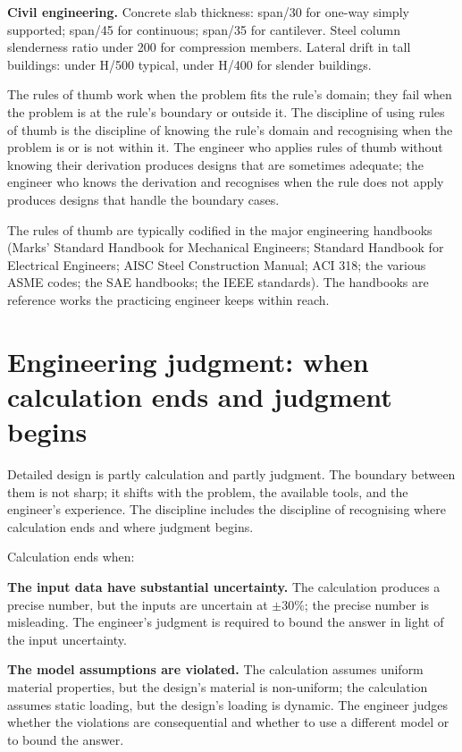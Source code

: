 \textbf{Civil engineering.} Concrete slab thickness: span/30 for one-way simply supported; span/45 for continuous; span/35 for cantilever. Steel column slenderness ratio under 200 for compression members. Lateral drift in tall buildings: under H/500 typical, under H/400 for slender buildings.

The rules of thumb work when the problem fits the rule's domain; they fail when the problem is at the rule's boundary or outside it. The discipline of using rules of thumb is the discipline of knowing the rule's domain and recognising when the problem is or is not within it. The engineer who applies rules of thumb without knowing their derivation produces designs that are sometimes adequate; the engineer who knows the derivation and recognises when the rule does not apply produces designs that handle the boundary cases.

The rules of thumb are typically codified in the major engineering handbooks (Marks' Standard Handbook for Mechanical Engineers; Standard Handbook for Electrical Engineers; AISC Steel Construction Manual; ACI 318; the various ASME codes; the SAE handbooks; the IEEE standards). The handbooks are reference works the practicing engineer keeps within reach.

\section{Engineering judgment: when calculation ends and judgment begins}

Detailed design is partly calculation and partly judgment. The boundary between them is not sharp; it shifts with the problem, the available tools, and the engineer's experience. The discipline includes the discipline of recognising where calculation ends and where judgment begins.

Calculation ends when:

\textbf{The input data have substantial uncertainty.} The calculation produces a precise number, but the inputs are uncertain at $\pm 30\%$; the precise number is misleading. The engineer's judgment is required to bound the answer in light of the input uncertainty.

\textbf{The model assumptions are violated.} The calculation assumes uniform material properties, but the design's material is non-uniform; the calculation assumes static loading, but the design's loading is dynamic. The engineer judges whether the violations are consequential and whether to use a different model or to bound the answer.

